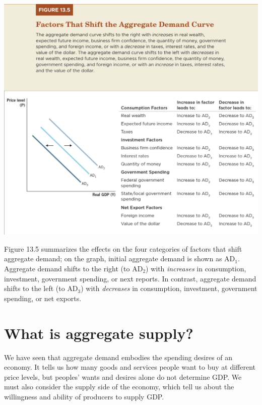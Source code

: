 \documentclass[11pt]{article} %
\begin{document}
\begin{center}
\includegraphics[scale=0.33]{images/Figure 13.5.png} 
\end{center}

Figure 13.5 summarizes the effects on the four categories of factors that shift aggregate demand; on the graph, initial aggregate demand is shown as \(\text{AD}_1\). Aggregate demand shifts to the right (to \(\text{AD}_2\)) with \textit{increases} in consumption, investment, government spending, or next reports. In contrast, aggregate demand shifts to the left (to \(\text{AD}_3\)) with \textit{decreases} in consumption, investment, government spending, or net exports.

\section*{\textbf{What is aggregate supply?}}
We have seen that aggregate demand embodies the spending desires of an economy. It tells us how many goods and services people want to buy at different price levels, but peoples' wants and desires alone do not determine GDP. We must also consider the supply side of the economy, which tell us about the willingness and ability of producers to supply GDP.
\end{document}
